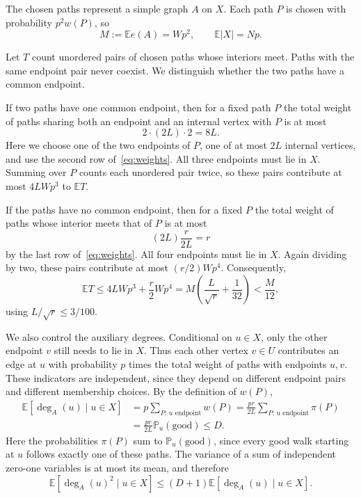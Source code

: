 \documentclass[11pt]{amsart}
\theoremstyle{remark}
\newcommand{\E}{\mathbb E}
\newcommand{\Prob}{\mathbb P}
\begin{document}
The chosen paths represent a simple graph $A$ on $X$. Each path $P$ is chosen with probability $p^2w(P)$, so
\begin{equation}\label{eq:edges}
M:=\E e(A)=Wp^2,
\qquad
\E|X|=Np.
\end{equation}

Let $T$ count unordered pairs of chosen paths whose interiors meet. Paths with the same endpoint pair never coexist. We distinguish whether the two paths have a common endpoint.

If two paths have one common endpoint, then for a fixed path $P$ the total weight of paths sharing both an endpoint and an internal vertex with $P$ is at most
\[
2\cdot(2L)\cdot2=8L.
\]
Here we choose one of the two endpoints of $P$, one of at most $2L$ internal vertices, and use the second row of~\eqref{eq:weights}. All three endpoints must lie in $X$. Summing over $P$ counts each unordered pair twice, so these pairs contribute at most $4LWp^3$ to $\E T$.

If the paths have no common endpoint, then for a fixed $P$ the total weight of paths whose interior meets that of $P$ is at most
\[
(2L)\frac r{2L}=r
\]
by the last row of~\eqref{eq:weights}. All four endpoints must lie in $X$. Again dividing by two, these pairs contribute at most $(r/2)Wp^4$. Consequently,
\begin{equation}\label{eq:conflicts}
\E T\le4LWp^3+\frac r2Wp^4
=M\left(\frac L{\sqrt r}+\frac1{32}\right)<\frac M{12},
\end{equation}
using $L/\sqrt r\le3/100$.

We also control the auxiliary degrees. Conditional on $u\in X$, only the other endpoint $v$ still needs to lie in $X$. Thus each other vertex $v\in U$ contributes an edge at $u$ with probability $p$ times the total weight of paths with endpoints $u,v$. These indicators are independent, since they depend on different endpoint pairs and different membership choices. By the definition of $w(P)$,
\[
\begin{aligned}
\E[\deg_A(u)\mid u\in X]
&=p\sum_{P:\,u\text{ endpoint}}w(P)
=\frac{pr}{2L}\sum_{P:\,u\text{ endpoint}}\pi(P)\\
&=\frac{pr}{2L}\Prob_u(\text{good})\le D.
\end{aligned}
\]
Here the probabilities $\pi(P)$ sum to $\Prob_u(\text{good})$, since every good walk starting at $u$ follows exactly one of these paths.
The variance of a sum of independent zero-one variables is at most its mean, and therefore
\[
\E[\deg_A(u)^2\mid u\in X]
\le(D+1)\E[\deg_A(u)\mid u\in X].
\]
\end{document}
